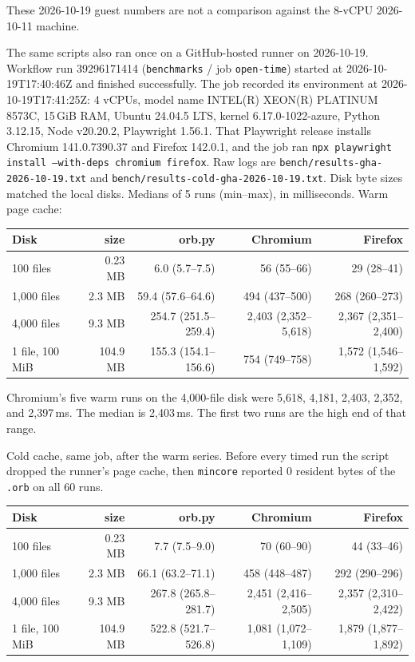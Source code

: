 \documentclass[11pt]{article}
\begin{document}
These 2026-10-19 guest numbers are not a comparison against the 8-vCPU 2026-10-11 machine.

The same scripts also ran once on a GitHub-hosted runner on 2026-10-19.
Workflow run 39296171414 (\texttt{benchmarks} / job \texttt{open-time}) started at 2026-10-19T17:40:46Z and finished successfully.
The job recorded its environment at 2026-10-19T17:41:25Z: 4 vCPUs, model name INTEL(R) XEON(R) PLATINUM 8573C, 15\,GiB RAM, Ubuntu 24.04.5 LTS, kernel 6.17.0-1022-azure, Python 3.12.15, Node v20.20.2, Playwright 1.56.1.
That Playwright release installs Chromium 141.0.7390.37 and Firefox 142.0.1, and the job ran \texttt{npx playwright install --with-deps chromium firefox}.
Raw logs are \texttt{bench/results-gha-2026-10-19.txt} and \texttt{bench/results-cold-gha-2026-10-19.txt}.
Disk byte sizes matched the local disks.
Medians of 5 runs (min--max), in milliseconds.
Warm page cache:

\begin{center}
\small
\begin{tabular}{lrrrr}
\toprule
Disk & size & orb.py & Chromium & Firefox \\
\midrule
100 files & 0.23 MB & 6.0 (5.7--7.5) & 56 (55--66) & 29 (28--41) \\
1,000 files & 2.3 MB & 59.4 (57.6--64.6) & 494 (437--500) & 268 (260--273) \\
4,000 files & 9.3 MB & 254.7 (251.5--259.4) & 2{,}403 (2{,}352--5{,}618) & 2{,}367 (2{,}351--2{,}400) \\
1 file, 100 MiB & 104.9 MB & 155.3 (154.1--156.6) & 754 (749--758) & 1{,}572 (1{,}546--1{,}592) \\
\bottomrule
\end{tabular}
\end{center}

Chromium's five warm runs on the 4,000-file disk were 5{,}618, 4{,}181, 2{,}403, 2{,}352, and 2{,}397\,ms.
The median is 2{,}403\,ms.
The first two runs are the high end of that range.

Cold cache, same job, after the warm series.
Before every timed run the script dropped the runner's page cache, then \texttt{mincore} reported 0 resident bytes of the \texttt{.orb} on all 60 runs.

\begin{center}
\small
\begin{tabular}{lrrrr}
\toprule
Disk & size & orb.py & Chromium & Firefox \\
\midrule
100 files & 0.23 MB & 7.7 (7.5--9.0) & 70 (60--90) & 44 (33--46) \\
1,000 files & 2.3 MB & 66.1 (63.2--71.1) & 458 (448--487) & 292 (290--296) \\
4,000 files & 9.3 MB & 267.8 (265.8--281.7) & 2{,}451 (2{,}416--2{,}505) & 2{,}357 (2{,}310--2{,}422) \\
1 file, 100 MiB & 104.9 MB & 522.8 (521.7--526.8) & 1{,}081 (1{,}072--1{,}109) & 1{,}879 (1{,}877--1{,}892) \\
\bottomrule
\end{tabular}
\end{center}
\end{document}
